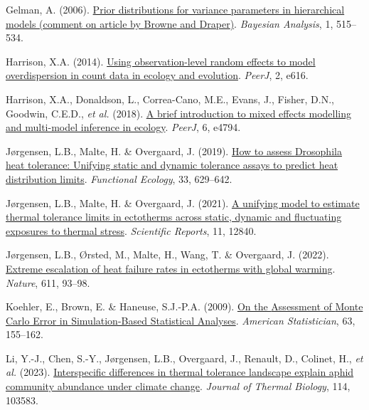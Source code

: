 \documentclass[
  11pt,
]{article}
\newlength{\cslhangindent}
\newenvironment{CSLReferences}[2] %
 {\begin{list}{}{%
  \setlength{\itemindent}{0pt}
  \setlength{\leftmargin}{0pt}
  \setlength{\parsep}{0pt}
  \ifodd #1
   \setlength{\leftmargin}{\cslhangindent}
   \setlength{\itemindent}{-1\cslhangindent}
  \fi
  \setlength{\itemsep}{#2\baselineskip}}}
 {\end{list}}
\begin{document}
\begin{CSLReferences}{1}{0}
Gelman, A. (2006). \href{https://doi.org/10.1214/06-BA117A}{Prior
distributions for variance parameters in hierarchical models (comment on
article by {Browne} and {Draper})}. \emph{Bayesian Analysis}, 1,
515--534.

Harrison, X.A. (2014). \href{https://doi.org/10.7717/peerj.616}{Using
observation-level random effects to model overdispersion in count data
in ecology and evolution}. \emph{PeerJ}, 2, e616.

Harrison, X.A., Donaldson, L., Correa-Cano, M.E., Evans, J., Fisher,
D.N., Goodwin, C.E.D., \emph{et al.} (2018).
\href{https://doi.org/10.7717/peerj.4794}{A brief introduction to mixed
effects modelling and multi-model inference in ecology}. \emph{PeerJ},
6, e4794.

Jørgensen, L.B., Malte, H. \& Overgaard, J. (2019).
\href{https://doi.org/10.1111/1365-2435.13279}{How to assess
{Drosophila} heat tolerance: Unifying static and dynamic tolerance
assays to predict heat distribution limits}. \emph{Functional Ecology},
33, 629--642.

Jørgensen, L.B., Malte, H. \& Overgaard, J. (2021).
\href{https://doi.org/10.1038/s41598-021-92004-6}{A unifying model to
estimate thermal tolerance limits in ectotherms across static, dynamic
and fluctuating exposures to thermal stress}. \emph{Scientific Reports},
11, 12840.

Jørgensen, L.B., Ørsted, M., Malte, H., Wang, T. \& Overgaard, J.
(2022). \href{https://doi.org/10.1038/s41586-022-05334-4}{Extreme
escalation of heat failure rates in ectotherms with global warming}.
\emph{Nature}, 611, 93--98.

Koehler, E., Brown, E. \& Haneuse, S.J.-P.A. (2009).
\href{https://doi.org/10.1198/tast.2009.0030}{On the {Assessment} of
{Monte Carlo Error} in {Simulation-Based Statistical Analyses}}.
\emph{American Statistician}, 63, 155--162.

Li, Y.-J., Chen, S.-Y., Jørgensen, L.B., Overgaard, J., Renault, D.,
Colinet, H., \emph{et al.} (2023).
\href{https://doi.org/10.1016/j.jtherbio.2023.103583}{Interspecific
differences in thermal tolerance landscape explain aphid community
abundance under climate change}. \emph{Journal of Thermal Biology}, 114,
103583.


\end{CSLReferences}
\end{document}

